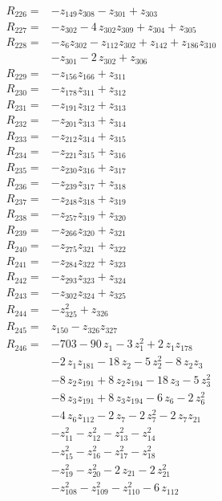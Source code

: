 \begin{align*}
R_{226}={}&-z_{149}z_{308} -z_{301} +z_{303}\\[2pt]
R_{227}={}&-z_{302} -4\,z_{302}z_{309} +z_{304} +z_{305}\\[2pt]
R_{228}={}&-z_{6}z_{302} -z_{112}z_{302} +z_{142} +z_{186}z_{310}\\
&-z_{301} -2\,z_{302} +z_{306}\\[2pt]
R_{229}={}&-z_{156}z_{166} +z_{311}\\[2pt]
R_{230}={}&-z_{178}z_{311} +z_{312}\\[2pt]
R_{231}={}&-z_{191}z_{312} +z_{313}\\[2pt]
R_{232}={}&-z_{201}z_{313} +z_{314}\\[2pt]
R_{233}={}&-z_{212}z_{314} +z_{315}\\[2pt]
R_{234}={}&-z_{221}z_{315} +z_{316}\\[2pt]
R_{235}={}&-z_{230}z_{316} +z_{317}\\[2pt]
R_{236}={}&-z_{239}z_{317} +z_{318}\\[2pt]
R_{237}={}&-z_{248}z_{318} +z_{319}\\[2pt]
R_{238}={}&-z_{257}z_{319} +z_{320}\\[2pt]
R_{239}={}&-z_{266}z_{320} +z_{321}\\[2pt]
R_{240}={}&-z_{275}z_{321} +z_{322}\\[2pt]
R_{241}={}&-z_{284}z_{322} +z_{323}\\[2pt]
R_{242}={}&-z_{293}z_{323} +z_{324}\\[2pt]
R_{243}={}&-z_{302}z_{324} +z_{325}\\[2pt]
R_{244}={}&-z_{325}^{2} +z_{326}\\[2pt]
R_{245}={}&z_{150} -z_{326}z_{327}\\[2pt]
R_{246}={}&-703 -90\,z_{1} -3\,z_{1}^{2} +2\,z_{1}z_{178}\\
&-2\,z_{1}z_{181} -18\,z_{2} -5\,z_{2}^{2} -8\,z_{2}z_{3}\\
&-8\,z_{2}z_{191} +8\,z_{2}z_{194} -18\,z_{3} -5\,z_{3}^{2}\\
&-8\,z_{3}z_{191} +8\,z_{3}z_{194} -6\,z_{6} -2\,z_{6}^{2}\\
&-4\,z_{6}z_{112} -2\,z_{7} -2\,z_{7}^{2} -2\,z_{7}z_{21}\\
&-z_{11}^{2} -z_{12}^{2} -z_{13}^{2} -z_{14}^{2}\\
&-z_{15}^{2} -z_{16}^{2} -z_{17}^{2} -z_{18}^{2}\\
&-z_{19}^{2} -z_{20}^{2} -2\,z_{21} -2\,z_{21}^{2}\\
&-z_{108}^{2} -z_{109}^{2} -z_{110}^{2} -6\,z_{112}\\

\end{align*}
